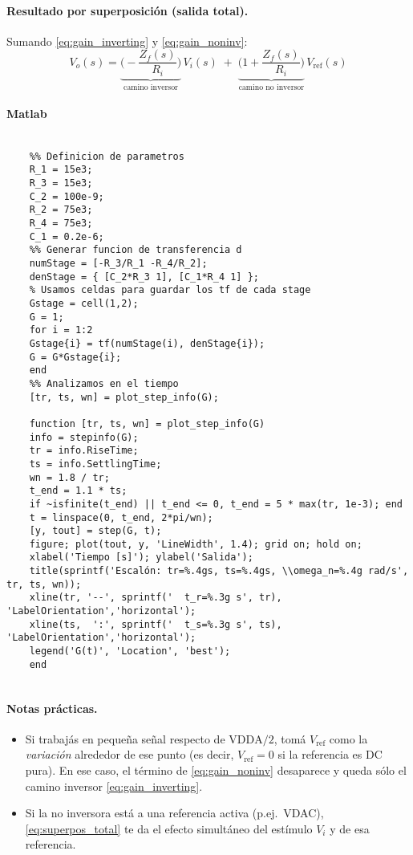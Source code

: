 \paragraph{Resultado por superposición (salida total).}
Sumando \eqref{eq:gain_inverting} y \eqref{eq:gain_noninv}:
\begin{equation}
	V_o(s)
	= \underbrace{\Bigg(-\frac{Z_f(s)}{R_i}\Bigg)}_{\text{camino inversor}}\,V_i(s)
	\;+\;
	\underbrace{\Bigg(1+\frac{Z_f(s)}{R_i}\Bigg)}_{\text{camino no inversor}}\,V_{\text{ref}}(s)
	\label{eq:superpos_total}
\end{equation}

\onecolumn
\paragraph{Matlab}


\begin{lstlisting}[style=matlabstyle,caption={Script en Matlab},label={lst:matlab}]
	
	%% Definicion de parametros
	R_1 = 15e3;
	R_3 = 15e3;
	C_2 = 100e-9;
	R_2 = 75e3;
	R_4 = 75e3;
	C_1 = 0.2e-6;
	%% Generar funcion de transferencia d
	numStage = [-R_3/R_1 -R_4/R_2];
	denStage = { [C_2*R_3 1], [C_1*R_4 1] };
	% Usamos celdas para guardar los tf de cada stage
	Gstage = cell(1,2);
	G = 1;
	for i = 1:2
	Gstage{i} = tf(numStage(i), denStage{i});
	G = G*Gstage{i};
	end
	%% Analizamos en el tiempo
	[tr, ts, wn] = plot_step_info(G);
	
	function [tr, ts, wn] = plot_step_info(G)
	info = stepinfo(G);
	tr = info.RiseTime;
	ts = info.SettlingTime;
	wn = 1.8 / tr;
	t_end = 1.1 * ts;
	if ~isfinite(t_end) || t_end <= 0, t_end = 5 * max(tr, 1e-3); end
	t = linspace(0, t_end, 2*pi/wn);
	[y, tout] = step(G, t);
	figure; plot(tout, y, 'LineWidth', 1.4); grid on; hold on;
	xlabel('Tiempo [s]'); ylabel('Salida');
	title(sprintf('Escalón: tr=%.4gs, ts=%.4gs, \\omega_n=%.4g rad/s', tr, ts, wn));
	xline(tr, '--', sprintf('  t_r=%.3g s', tr), 'LabelOrientation','horizontal');
	xline(ts,  ':', sprintf('  t_s=%.3g s', ts), 'LabelOrientation','horizontal');
	legend('G(t)', 'Location', 'best');
	end
	
\end{lstlisting}
\twocolumn

\paragraph{Notas prácticas.}
\begin{itemize}
	\item Si trabajás en pequeña señal respecto de $\text{VDDA}/2$, tomá $V_{\text{ref}}$ como la \emph{variación} alrededor de ese punto (es decir, $V_{\text{ref}}=0$ si la referencia es DC pura). En ese caso, el término de \eqref{eq:gain_noninv} desaparece y queda sólo el camino inversor \eqref{eq:gain_inverting}.
	\item Si la no inversora está a una referencia activa (p.ej.\ VDAC), \eqref{eq:superpos_total} te da el efecto simultáneo del estímulo $V_i$ y de esa referencia.
\end{itemize}

